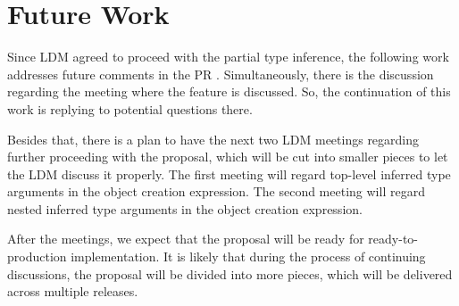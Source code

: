 \chapter{Future Work} \label{sect14:future}

Since \ac{LDM} agreed to proceed with the partial type inference, the following work addresses future comments in the PR \cite{online:pull2}. 
Simultaneously, there is the discussion \cite{online:mettingSummaryDisc} regarding the meeting where the feature is discussed. 
So, the continuation of this work is replying to potential questions there.
\par
Besides that, there is a plan to have the next two \ac{LDM} meetings regarding further proceeding with the proposal, which will be cut into smaller pieces to let the LDM discuss it properly. 
The first meeting will regard top-level inferred type arguments in the object creation expression. 
The second meeting will regard nested inferred type arguments in the object creation expression.
\par
After the meetings, we expect that the proposal will be ready for ready-to-production implementation. 
It is likely that during the process of continuing discussions, the proposal will be divided into more pieces, which will be delivered across multiple releases.